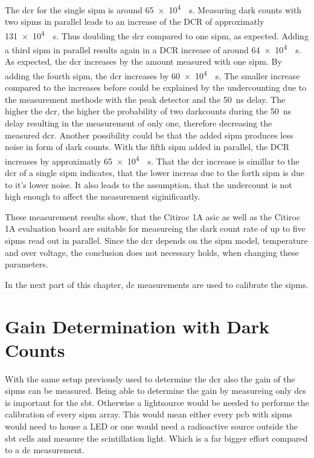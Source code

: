 The \ac{dcr} for the single \ac{sipm} is around \SI{65e4}{\per\second}. 
Measuring dark counts with two \ac{sipm}s in parallel leads to an increase of the DCR of approximatly \SI{131e4}{\per\second}. 
Thus doubling the \ac{dcr} compared to one \ac{sipm}, as expected.
Adding a third \ac{sipm} in parallel results again in a DCR increase of around \SI{64e4}{\per\second}.
As expected, the \ac{dcr} increases by the amount measured with one \ac{sipm}.
By adding the fourth \ac{sipm}, the \ac{dcr} increases by \SI{60e4}{\per\second}. 
The smaller increase compared to the increases before could be explained by the undercounting due to the measurement methode with the peak detector and the \SI{50}{\nano\second} delay.
The higher the \ac{dcr}, the higher the probability of two darkcounts during the \SI{50}{\nano\second} delay resulting in the measurement of only one, therefore decreasing the measured \ac{dcr}.
Another possibility could be that the added \ac{sipm} produces less noise in form of dark counts.
With the fifth \ac{sipm} added in parallel, the DCR increases by approximatly \SI{65e4}{\per\second}.
That the \ac{dcr} increase is simillar to the \ac{dcr} of a single \ac{sipm} indicates, that the lower increas due to the forth \ac{sipm} is due to it's lower noise.
It also leads to the assumption, that the undercount is not high enough to affect the measurement siginificantly.

These measurement results show, that the Citiroc 1A \ac{asic} as well as the Citiroc 1A evaluation board are suitable for measureing the dark count rate of up to five \acp{sipm} read out in parallel.
Since the \ac{dcr} depends on the \ac{sipm} model, temperature and over voltage, the conclusion does not necessary holds, when changing these parameters.

In the next part of this chapter, \ac{dc} measurements are used to calibrate the \acp{sipm}.


\FloatBarrier
\section{Gain Determination with Dark Counts}
With the same setup previously used to determine the \ac{dcr} also the gain of the \acp{sipm} can be measured.
Being able to determine the gain by measureing only \acp{dc} is important for the \ac{sbt}.
Otherwise a lightsource would be needed to performe the calibration of every \ac{sipm} array.
This would mean either every \ac{pcb} with \acp{sipm} would need to house a LED or one would need a radioactive source outside the \ac{sbt} cells and measure the scintillation light. 
Which is a far bigger effort compared to a \ac{dc} measurement.

